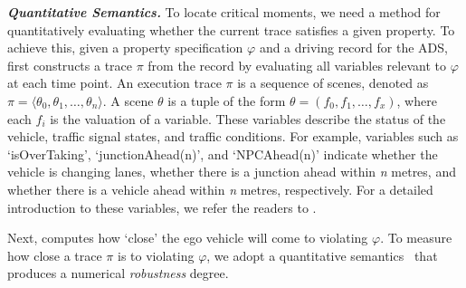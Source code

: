 \noindent \emph{\textbf{Quantitative Semantics.}}
\label{sec:Quantitative_Semantics}
To locate critical moments, we need a method for quantitatively evaluating whether the current trace satisfies a given property. To achieve this, given a property specification $\varphi$ and a driving record for the ADS, \coolname first constructs a trace $\pi$ from the record by evaluating all variables relevant to $\varphi$ at each time point. 
An execution trace $\pi$ is a sequence of scenes, denoted as {\small $\pi=\langle \theta_0, \theta_1, \ldots, \theta_n \rangle$}. A scene $\theta$ is a tuple of the form {\small $\theta=( f_0, f_1, \ldots, f_x )$}, where each $f_i$ is the valuation of a variable.
These variables describe the status of the vehicle, traffic signal states, and traffic conditions. For example, variables such as `isOverTaking', `junctionAhead(n)', and `NPCAhead(n)' indicate whether the vehicle is changing lanes, whether there is a junction ahead within \emph{n} metres, and whether there is a vehicle ahead within \emph{n} metres, respectively.
For a detailed introduction to these variables, we refer the readers to \cite{Sun-Poskitt-et_al22a}.

Next, \coolname computes how `close' the ego vehicle will come to violating $\varphi$.
To measure how close a trace $\pi$ is to violating $\varphi$, we adopt a quantitative semantics~\cite{maler2004monitoring, deshmukh2017robust,nivckovic2020rtamt} that produces a numerical \emph{robustness} degree. 

